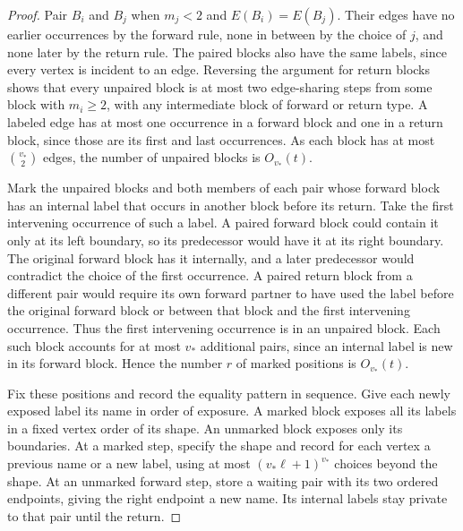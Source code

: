 \documentclass[preprints,article,submit,oneauthor]{Definitions/mdpi}
\begin{document}
\begin{proof}
Pair \(B_i\) and \(B_j\) when \(m_j<2\) and \(E(B_i)=E(B_j)\). Their edges
have no earlier occurrences by the forward rule, none in between by
the choice of \(j\), and none later by the return rule.
The paired blocks also have the same labels, since every vertex is
incident to an edge.
Reversing the argument for return blocks shows that
every unpaired block is at most two edge-sharing steps from some
block with \(m_i\ge2\), with any intermediate block of forward or
return type. A labeled edge has at most one occurrence in a forward
block and one in a return block, since those are its first and last
occurrences. As each block has at most \(\binom{v_\ast}{2}\) edges, the
number of unpaired blocks is \(O_{v_\ast}(t)\).

Mark the unpaired blocks and both members of each pair whose forward
block has an internal label that occurs in another block before its
return. Take the first intervening occurrence of such a label. A
paired forward block could contain it only at its left boundary, so
its predecessor would have it at its right boundary. The original
forward block has it internally, and a later predecessor would
contradict the choice of the first occurrence. A paired return block
from a different pair would require its own forward partner to have
used the label before the original forward block or between that
block and the first intervening occurrence. Thus the first
intervening occurrence is in an unpaired block.
Each such block accounts for at most \(v_\ast\)
additional pairs, since an internal label is new in its forward
block. Hence the number \(r\) of marked positions is \(O_{v_\ast}(t)\).

Fix these positions and record the equality pattern in sequence.
Give each newly exposed label its name in order of exposure. A marked
block exposes all its labels in a fixed vertex order of its shape.
An unmarked block exposes only its boundaries. At a marked step,
specify the shape and record for each vertex a previous name or a
new label, using at most \((v_\ast\ell+1)^{v_\ast}\) choices beyond the
shape. At an unmarked forward step, store a waiting pair with its two ordered
endpoints, giving the right endpoint a new name. Its internal labels
stay private to that pair until the return.


\end{proof}
\end{document}
